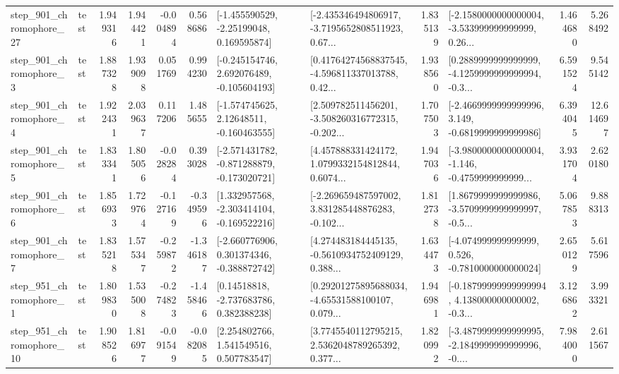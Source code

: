 \begin{tabular}{llrrrrllrlrr}
  step\_901\_chromophore\_27 &      test &      1.949316 &    1.944421 &     -0.004894 &  0.568686 &    [-1.455590529, -2.25199048, 0.169595874] &  [-2.435346494806917, -3.7195652808511923, 0.67... &       1.835139 &  [-2.1580000000000004, -3.533999999999999, 0.26... &            1.464680 &          5.268492 \\
   step\_901\_chromophore\_3 &      test &      1.887328 &    1.939098 &      0.051769 &  0.994230 &   [-0.245154746, 2.692076489, -0.105604193] &  [0.41764274568837545, -4.596811337013788, 0.42... &       1.938560 &  [0.2889999999999999, -4.1259999999999994, -0.3... &            6.591524 &          9.545142 \\
   step\_901\_chromophore\_4 &      test &      1.922431 &    2.039637 &      0.117206 &  1.485655 &    [-1.574745625, 2.12648511, -0.160463555] &  [2.509782511456201, -3.508260316772315, -0.202... &       1.707503 &  [-2.4669999999999996, 3.149, -0.6819999999999986] &            6.394045 &         12.614697 \\
   step\_901\_chromophore\_5 &      test &      1.833341 &    1.805056 &     -0.028284 &  0.393028 &  [-2.571431782, -0.871288879, -0.173020721] &  [4.457888331424172, 1.0799332154812844, 0.6074... &       1.947036 &  [-3.9800000000000004, -1.146, -0.4759999999999... &            3.931704 &          2.620180 \\
   step\_901\_chromophore\_6 &      test &      1.856933 &    1.729764 &     -0.127169 & -0.349596 &   [1.332957568, -2.303414104, -0.169522216] &  [-2.269659487597002, 3.831285448876283, -0.102... &       1.812738 &  [1.8679999999999986, -3.5709999999999997, -0.5... &            5.067853 &          9.888313 \\
   step\_901\_chromophore\_7 &      test &      1.835218 &    1.575347 &     -0.259872 & -1.346187 &   [-2.660776906, 0.301374346, -0.388872742] &  [4.274483184445135, -0.5610934752409129, 0.388... &       1.634473 &   [-4.074999999999999, 0.526, -0.7810000000000024] &            2.650129 &          5.617596 \\
   step\_951\_chromophore\_1 &      test &      1.809830 &    1.535008 &     -0.274823 & -1.458466 &     [0.14518818, -2.737683786, 0.382388238] &  [0.29201275895688034, -4.65531588100107, 0.079... &       1.946981 &  [-0.18799999999999994, 4.138000000000002, -0.3... &            3.126862 &          3.993321 \\
  step\_951\_chromophore\_10 &      test &      1.908526 &    1.816977 &     -0.091549 & -0.082085 &     [2.254802766, 1.541549516, 0.507783547] &  [3.7745540112795215, 2.5362048789265392, 0.377... &       1.820992 &  [-3.4879999999999995, -2.1849999999999996, -0.... &            7.984000 &          2.611567 \\

\end{tabular}

